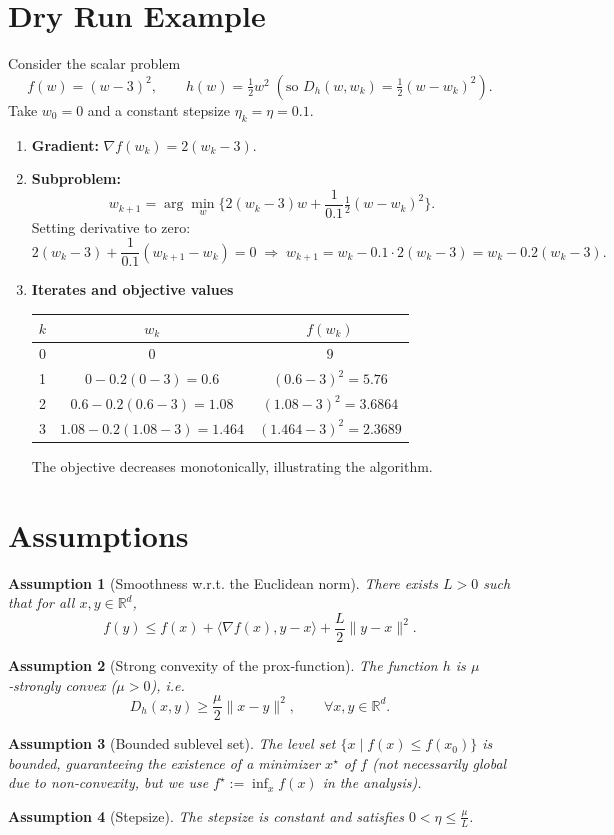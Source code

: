 \documentclass{article}
\newtheorem{assumption}{Assumption}
\newcommand{\grad}{\nabla}
\newcommand{\Breg}{D_h}
\newcommand{\R}{\mathbb{R}}
\begin{document}
\section*{Dry Run Example}
Consider the scalar problem
\[
f(w)=(w-3)^2,\qquad h(w)=\tfrac12 w^2\;( \text{so } \Breg(w,w_k)=\tfrac12 (w-w_k)^2).
\]
Take $w_0=0$ and a constant stepsize $\eta_k=\eta=0.1$.

\begin{enumerate}[label=\textbf{Iter \arabic*:}, leftmargin=*]
\item \textbf{Gradient:} $\grad f(w_k)=2(w_k-3)$.
\item \textbf{Subproblem:}
\[
w_{k+1}= \arg\min_{w}\Big\{ 2(w_k-3) w +\frac{1}{0.1}\tfrac12 (w-w_k)^2\Big\}.
\]
Setting derivative to zero:
\[
2(w_k-3)+\frac{1}{0.1}(w_{k+1}-w_k)=0
\;\Longrightarrow\;
w_{k+1}=w_k-0.1\cdot 2(w_k-3)=w_k-0.2(w_k-3).
\]

\item \textbf{Iterates and objective values}
\begin{center}
\begin{tabular}{c|c|c}
$k$ & $w_k$ & $f(w_k)$\\ \hline
0 & $0$ & $9$\\
1 & $0-0.2(0-3)=0.6$ & $(0.6-3)^2=5.76$\\
2 & $0.6-0.2(0.6-3)=1.08$ & $(1.08-3)^2=3.6864$\\
3 & $1.08-0.2(1.08-3)=1.464$ & $(1.464-3)^2=2.3689$
\end{tabular}
\end{center}
The objective decreases monotonically, illustrating the algorithm.
\end{enumerate}

\newpage
\section*{Assumptions}
\begin{assumption}[Smoothness w.r.t. the Euclidean norm]\label{as:smooth}
There exists $L>0$ such that for all $x,y\in\R^{d}$,
\[
f(y)\le f(x)+\langle \grad f(x),y-x\rangle+\frac{L}{2}\|y-x\|^{2}.
\]
\end{assumption}
\begin{assumption}[Strong convexity of the prox‑function]\label{as:strong}
The function $h$ is $\mu$‑strongly convex ($\mu>0$), i.e.
\[
\Breg(x,y)\ge \frac{\mu}{2}\|x-y\|^{2},\qquad\forall x,y\in\R^{d}.
\]
\end{assumption}
\begin{assumption}[Bounded sublevel set]\label{as:bound}
The level set $\{x\mid f(x)\le f(x_0)\}$ is bounded, guaranteeing the existence of a minimizer $x^\star$ of $f$ (not necessarily global due to non‑convexity, but we use $f^\star:=\inf_{x}f(x)$ in the analysis).
\end{assumption}
\begin{assumption}[Stepsize]\label{as:step}
The stepsize is constant and satisfies $0<\eta\le \frac{\mu}{L}$.
\end{assumption}
\end{document}
